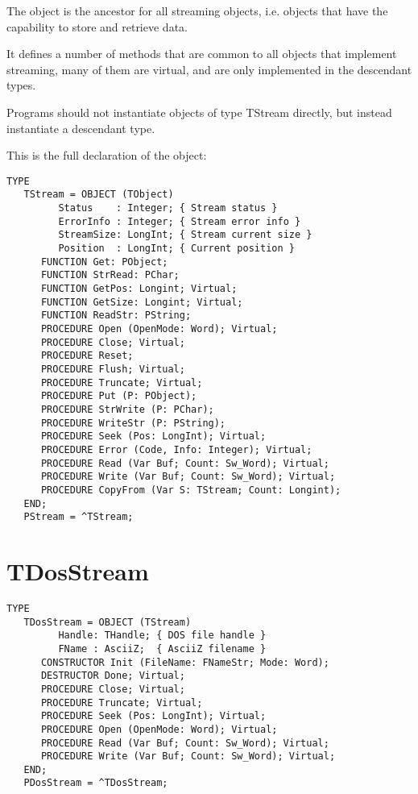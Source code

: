 The  object is the ancestor for all streaming objects, i.e.
objects that have the capability to store and retrieve data.

It defines a number of methods that are common to all objects that implement
streaming, many of them are virtual, and are only implemented in the
descendant types.

Programs should not instantiate objects of type TStream directly, but
instead instantiate a descendant type.

This is the full declaration of the  object:
\begin{verbatim}
TYPE
   TStream = OBJECT (TObject)
         Status    : Integer; { Stream status }
         ErrorInfo : Integer; { Stream error info }
         StreamSize: LongInt; { Stream current size }
         Position  : LongInt; { Current position }
      FUNCTION Get: PObject;
      FUNCTION StrRead: PChar;
      FUNCTION GetPos: Longint; Virtual;
      FUNCTION GetSize: Longint; Virtual;
      FUNCTION ReadStr: PString;
      PROCEDURE Open (OpenMode: Word); Virtual;
      PROCEDURE Close; Virtual;
      PROCEDURE Reset;
      PROCEDURE Flush; Virtual;
      PROCEDURE Truncate; Virtual;
      PROCEDURE Put (P: PObject);
      PROCEDURE StrWrite (P: PChar);
      PROCEDURE WriteStr (P: PString);
      PROCEDURE Seek (Pos: LongInt); Virtual;
      PROCEDURE Error (Code, Info: Integer); Virtual;
      PROCEDURE Read (Var Buf; Count: Sw_Word); Virtual;
      PROCEDURE Write (Var Buf; Count: Sw_Word); Virtual;
      PROCEDURE CopyFrom (Var S: TStream; Count: Longint);
   END;
   PStream = ^TStream;
\end{verbatim}

\section{TDosStream}
\label{se:TDosStream}

\begin{verbatim}
TYPE
   TDosStream = OBJECT (TStream)
         Handle: THandle; { DOS file handle }
         FName : AsciiZ;  { AsciiZ filename }
      CONSTRUCTOR Init (FileName: FNameStr; Mode: Word);
      DESTRUCTOR Done; Virtual;
      PROCEDURE Close; Virtual;
      PROCEDURE Truncate; Virtual;
      PROCEDURE Seek (Pos: LongInt); Virtual;
      PROCEDURE Open (OpenMode: Word); Virtual;
      PROCEDURE Read (Var Buf; Count: Sw_Word); Virtual;
      PROCEDURE Write (Var Buf; Count: Sw_Word); Virtual;
   END;
   PDosStream = ^TDosStream;
\end{verbatim}

